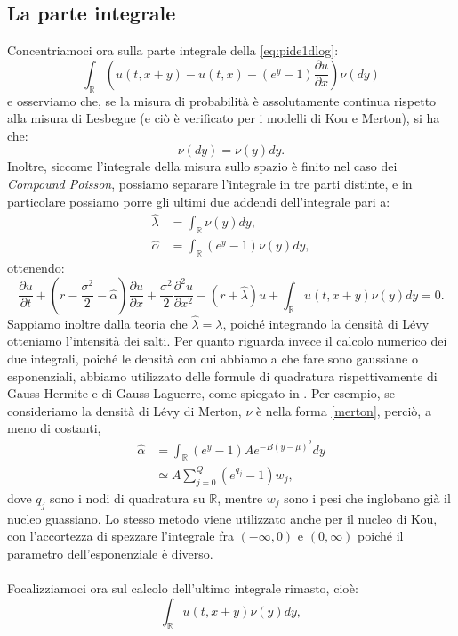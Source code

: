 \documentclass[a4paper,10pt]{report}
\newcommand{\der}[2]{\frac{\partial #1}{\partial #2}}
\newcommand{\dder}[2]{\frac{\partial^2 #1}{\partial #2^2}}
\theoremstyle{plain}
\theoremstyle{definition}
\theoremstyle{remark}
\begin{document}
\subsection{La parte integrale}
Concentriamoci ora sulla parte integrale della \ref{eq:pide1dlog}:$$\int_\mathbb{R}\left(u(t,x+y)-u(t,x)-(e^y-1)\der{u}{x}\right)\nu(dy)$$e osserviamo che, se la misura di probabilità è assolutamente continua rispetto alla misura di Lesbegue (e ci\`o \`e verificato per i modelli di Kou e Merton), si ha che:$$\nu(dy)=\nu(y)dy.$$ Inoltre, siccome l'integrale della misura sullo spazio è finito nel caso dei \emph{Compound Poisson}, possiamo separare l'integrale in tre parti distinte, e in particolare possiamo porre gli ultimi due addendi dell'integrale pari a:
\begin{align*}
\hat{\lambda}&=\int_{\mathbb{R}}\nu(y)dy,\\
\hat{\alpha}&=\int_{\mathbb{R}}(e^y-1)\nu(y)dy,
\end{align*}
ottenendo: $$\der{u}{t}+\left(r-\frac{\sigma^2}{2}-\hat{\alpha}\right)\der{u}{x}+\frac{\sigma^2}{2}\dder{u}{x}-(r+\hat{\lambda})u+\int_\mathbb{R}u(t,x+y)\nu(y)dy=0.$$
Sappiamo inoltre dalla teoria che $\hat{\lambda}=\lambda$, poich\'e integrando la densit\`a di L\'evy otteniamo l'intensit\`a dei salti. Per quanto riguarda invece il calcolo numerico dei due integrali, poich\'e le densit\`a con cui abbiamo a che fare sono gaussiane o esponenziali, abbiamo utilizzato delle formule di quadratura rispettivamente di Gauss-Hermite e di Gauss-Laguerre, come spiegato in \cite{qss2007}. Per esempio, se consideriamo la densit\`a di L\'evy di Merton, $\nu$ \`e nella forma \ref{merton}, perci\`o, a meno di costanti,
\begin{align*}
\hat{\alpha}&=\int_{\mathbb{R}}(e^y-1)Ae^{-B(y-\mu)^2}dy\\
&\simeq A\sum_{j=0}^{Q}(e^{q_j}-1)w_j,
\end{align*}
dove $q_j$ sono i nodi di quadratura su $\mathbb{R}$, mentre $w_j$ sono i pesi che inglobano gi\`a il nucleo guassiano. Lo stesso metodo viene utilizzato anche per il nucleo di Kou, con l'accortezza di spezzare l'integrale fra $(-\infty,0)$ e $(0,\infty)$ poich\'e il parametro dell'esponenziale \`e diverso.\\\\Focalizziamoci ora sul calcolo dell'ultimo integrale rimasto, cio\`e:
\begin{equation}
\int_\mathbb{R}u(t,x+y)\nu(y)dy,
\label{intnonlocal}
\end{equation}
\end{document}

